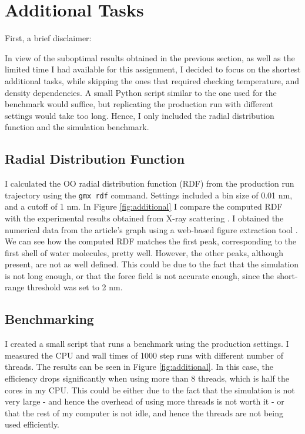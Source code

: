 \documentclass[a4paper,11pt]{article}
\begin{document}
\section{Additional Tasks}

First, a brief disclaimer: 

In view of the suboptimal results obtained in the previous section, as well as the limited time I had available for this assignment, I decided to focus on the shortest additional tasks, while skipping the ones that required checking temperature, and density dependencies. A small Python script similar to the one used for the benchmark would suffice, but replicating the production run with different settings would take too long. Hence, I only included the radial distribution function and the simulation benchmark.

\subsection{Radial Distribution Function}

I calculated the OO radial distribution function (RDF) from the production run trajectory using the \texttt{gmx rdf} command. Settings included a bin size of 0.01 nm, and a cutoff of 1 nm. In Figure \ref{fig:additional} I compare the computed RDF with the experimental results obtained from X-ray scattering \cite{water_structure, xray_scattering}. I obtained the numerical data from the article's graph using a web-based figure extraction tool \cite{plotdigitizer}. We can see how the computed RDF matches the first peak, corresponding to the first shell of water molecules, pretty well. However, the other peaks, although present, are not as well defined. This could be due to the fact that the simulation is not long enough, or that the force field is not accurate enough, since the short-range threshold was set to 2 nm.

\subsection{Benchmarking}

I created a small script that runs a benchmark using the production settings. I measured the CPU and wall times of 1000 step runs with different number of threads. The results can be seen in Figure \ref{fig:additional}. In this case, the efficiency drops significantly when using more than 8 threads, which is half the cores in my CPU. This could be either due to the fact that the simulation is not very large - and hence the overhead of using more threads is not worth it - or that the rest of my computer is not idle, and hence the threads are not being used efficiently.
\end{document}
